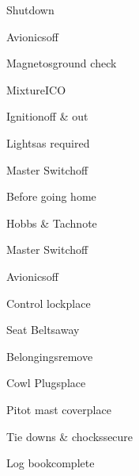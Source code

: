 \begin{multicols}{2}
\begin{checklist}{Shutdown}
    \item{Avionics}{off}
    \item{Magnetos}{ground check}
    \item{Mixture}{ICO}
    \item{Ignition}{off \& out}
    \item{Lights}{as required}
    \item{Master Switch}{off}
\end{checklist}

\begin{checklist}{Before going home}
    \item{Hobbs \& Tach}{note}
    \item{Master Switch}{off}
    \item{Avionics}{off}
    \item{Control lock}{place}
    \item{Seat Belts}{away}
    \item{Belongings}{remove}
    \item{Cowl Plugs}{place}
    \item{Pitot mast cover}{place}
    \item{Tie downs \& chocks}{secure}
    \item{Log book}{complete}
\end{checklist}
\end{multicols}

